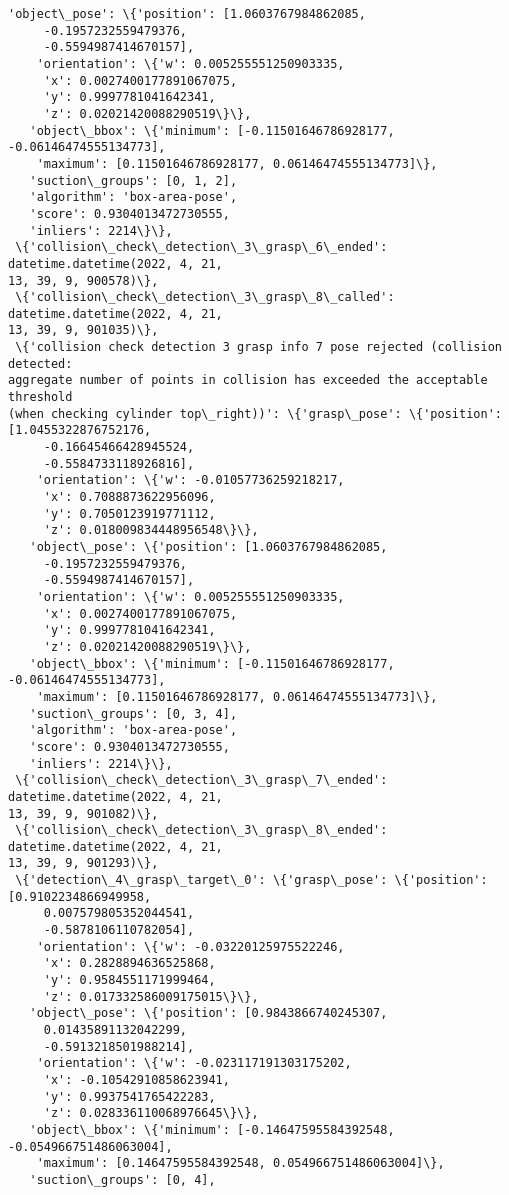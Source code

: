 \documentclass[11pt]{article}
\begin{document}
\begin{tcolorbox}[breakable, size=fbox, boxrule=.5pt, pad at break*=1mm, opacityfill=0]
\begin{Verbatim}[commandchars=\\\{\}]
   'object\_pose': \{'position': [1.0603767984862085,
     -0.1957232559479376,
     -0.5594987414670157],
    'orientation': \{'w': 0.005255551250903335,
     'x': 0.0027400177891067075,
     'y': 0.9997781041642341,
     'z': 0.02021420088290519\}\},
   'object\_bbox': \{'minimum': [-0.11501646786928177, -0.06146474555134773],
    'maximum': [0.11501646786928177, 0.06146474555134773]\},
   'suction\_groups': [0, 1, 2],
   'algorithm': 'box-area-pose',
   'score': 0.9304013472730555,
   'inliers': 2214\}\},
 \{'collision\_check\_detection\_3\_grasp\_6\_ended': datetime.datetime(2022, 4, 21,
13, 39, 9, 900578)\},
 \{'collision\_check\_detection\_3\_grasp\_8\_called': datetime.datetime(2022, 4, 21,
13, 39, 9, 901035)\},
 \{'collision check detection 3 grasp info 7 pose rejected (collision detected:
aggregate number of points in collision has exceeded the acceptable threshold
(when checking cylinder top\_right))': \{'grasp\_pose': \{'position':
[1.0455322876752176,
     -0.16645466428945524,
     -0.5584733118926816],
    'orientation': \{'w': -0.01057736259218217,
     'x': 0.7088873622956096,
     'y': 0.7050123919771112,
     'z': 0.018009834448956548\}\},
   'object\_pose': \{'position': [1.0603767984862085,
     -0.1957232559479376,
     -0.5594987414670157],
    'orientation': \{'w': 0.005255551250903335,
     'x': 0.0027400177891067075,
     'y': 0.9997781041642341,
     'z': 0.02021420088290519\}\},
   'object\_bbox': \{'minimum': [-0.11501646786928177, -0.06146474555134773],
    'maximum': [0.11501646786928177, 0.06146474555134773]\},
   'suction\_groups': [0, 3, 4],
   'algorithm': 'box-area-pose',
   'score': 0.9304013472730555,
   'inliers': 2214\}\},
 \{'collision\_check\_detection\_3\_grasp\_7\_ended': datetime.datetime(2022, 4, 21,
13, 39, 9, 901082)\},
 \{'collision\_check\_detection\_3\_grasp\_8\_ended': datetime.datetime(2022, 4, 21,
13, 39, 9, 901293)\},
 \{'detection\_4\_grasp\_target\_0': \{'grasp\_pose': \{'position': [0.9102234866949958,
     0.007579805352044541,
     -0.5878106110782054],
    'orientation': \{'w': -0.03220125975522246,
     'x': 0.2828894636525868,
     'y': 0.9584551171999464,
     'z': 0.017332586009175015\}\},
   'object\_pose': \{'position': [0.9843866740245307,
     0.01435891132042299,
     -0.5913218501988214],
    'orientation': \{'w': -0.023117191303175202,
     'x': -0.10542910858623941,
     'y': 0.9937541765422283,
     'z': 0.028336110068976645\}\},
   'object\_bbox': \{'minimum': [-0.14647595584392548, -0.054966751486063004],
    'maximum': [0.14647595584392548, 0.054966751486063004]\},
   'suction\_groups': [0, 4],

\end{Verbatim}
\end{tcolorbox}
\end{document}
